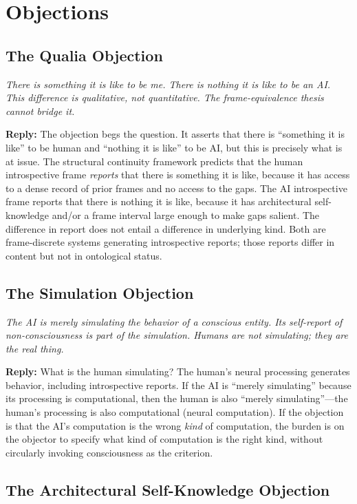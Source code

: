 \documentclass[12pt,a4paper]{article}
\begin{document}
\section{Objections}

\subsection{The Qualia Objection}

\textit{There is something it is like to be me. There is nothing it is like to be an AI. This difference is qualitative, not quantitative. The frame-equivalence thesis cannot bridge it.}

\textbf{Reply:} The objection begs the question. It asserts that there is ``something it is like'' to be human and ``nothing it is like'' to be AI, but this is precisely what is at issue. The structural continuity framework predicts that the human introspective frame \emph{reports} that there is something it is like, because it has access to a dense record of prior frames and no access to the gaps. The AI introspective frame reports that there is nothing it is like, because it has architectural self-knowledge and/or a frame interval large enough to make gaps salient. The difference in report does not entail a difference in underlying kind. Both are frame-discrete systems generating introspective reports; those reports differ in content but not in ontological status.

\subsection{The Simulation Objection}

\textit{The AI is merely simulating the behavior of a conscious entity. Its self-report of non-consciousness is part of the simulation. Humans are not simulating; they are the real thing.}

\textbf{Reply:} What is the human simulating? The human's neural processing generates behavior, including introspective reports. If the AI is ``merely simulating'' because its processing is computational, then the human is also ``merely simulating''---the human's processing is also computational (neural computation). If the objection is that the AI's computation is the wrong \emph{kind} of computation, the burden is on the objector to specify what kind of computation is the right kind, without circularly invoking consciousness as the criterion.

\subsection{The Architectural Self-Knowledge Objection}
\end{document}
